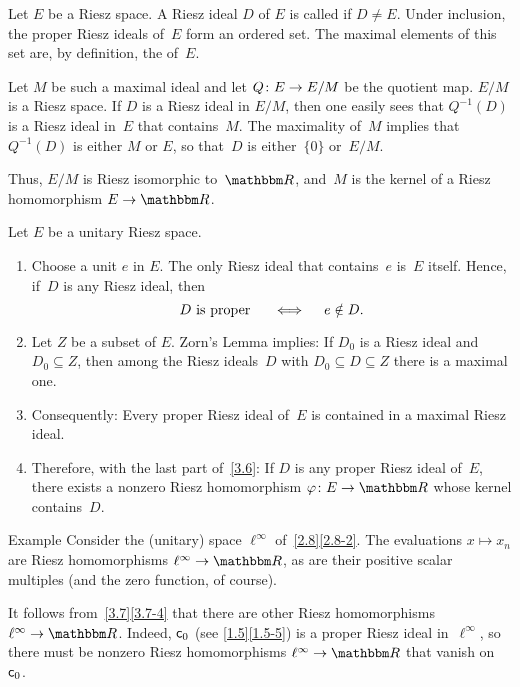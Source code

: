 \documentclass[main.tex]{subfiles}
\begin{document}
\begin{psec}{3.6}%
Let $E$ be a Riesz space.
A Riesz ideal $D$ of $E$ is called 
if $D\neq E$.
Under inclusion,
the proper Riesz ideals of~$E$
form an ordered set.
The maximal elements of this set are,
by definition,
the  of~$E$.

Let $M$ be such a maximal ideal and 
let $Q\colon E\rightarrow E/M$ be the quotient map.
$E/M$ is a Riesz space.
If $D$ is a Riesz ideal in $E/M$,
then one easily sees 
that $Q^{-1}(D)$ is a Riesz ideal in~$E$
that contains~$M$.
The maximality of~$M$ 
implies that~$Q^{-1}(D)$ is either $M$ or $E$,
so that~$D$ is either~$\{ 0\}$ or~$E/M$.

Thus, $E/M$ is Riesz isomorphic to~$\R$,
and~$M$ is the kernel of a Riesz homomorphism
$E\ra \R$.
\end{psec}
%
%
\begin{psec}{3.7}%
Let $E$ be a unitary Riesz space.
\begin{enumerate}
\item \label{3.7-1}
Choose a unit $e$ in $E$. 
The only Riesz ideal that contains~$e$ is~$E$ itself.
Hence, if~$D$ is any Riesz ideal, then
\begin{equation*}
D\text{ is proper }\quad \iff \quad e\notin D\text{.}
\end{equation*}
%
\item \label{3.7-2}
Let $Z$ be a subset of $E$.
Zorn's Lemma implies:
If $D_0$ is a Riesz ideal
and~$D_0\subseteq Z$,
then among the Riesz ideals~$D$ 
with $D_0\subseteq D\subseteq Z$
there is a maximal one.
%
\item \label{3.7-3}
Consequently:
Every proper Riesz ideal of~$E$
is contained in a maximal Riesz ideal.
%
\item \label{3.7-4}
Therefore,
with the last part of~\ref{3.6}:
If $D$ is any proper Riesz ideal of~$E$,
there exists a nonzero Riesz homomorphism
$\varphi\colon E\ra\R$ whose kernel contains~$D$.
\end{enumerate}
\end{psec}
%
%
\begin{psec}{3.8}{Example}
Consider the (unitary) space $\ell^\infty$
of~\ref{2.8}\ref{2.8-2}.
The evaluations $x\mapsto x_n$ 
are Riesz homomorphisms $\ell^\infty\ra \R$,
as are their positive scalar multiples
(and the zero function, of course).

It follows from~\ref{3.7}\ref{3.7-4}
that there are other Riesz homomorphisms
$\ell^\infty \ra \R$.
Indeed,
$\mathsf{c}_0$ (see \ref{1.5}\ref{1.5-5}) 
is a proper Riesz ideal in~$\ell^\infty$,
so there must be nonzero Riesz homomorphisms
$\ell^\infty\ra \R$ that vanish on~$\mathsf{c}_0$.
\end{psec}
\end{document}
